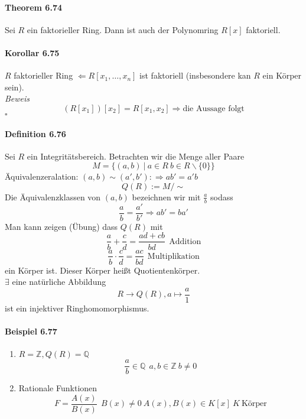 \documentclass{scrartcl}
\begin{document}
\paragraph{Theorem 6.74}
Sei $R$ ein faktorieller Ring. Dann ist auch der Polynomring $R[x]$ faktoriell.

\paragraph{Korollar 6.75}
$R$ faktorieller Ring $\Leftarrow R[x_1, \dots, x_n]$ ist faktoriell
(insbesondere kan $R$ ein Körper sein). \\
\textit{Beweis} \\
\[
  (R[x_1])[x_2] = R[x_1,x_2] \Rightarrow \text{die Aussage folgt}
\]
\hfill $\square$

\paragraph{Definition 6.76}
Sei $R$ ein Integritätsbereich. Betrachten wir die Menge aller Paare
\[
  M = \{(a,b) ~|~ a \in R ~ b \in R\backslash \{0\} \}
\]
Äquivalenzeralation: $(a,b) \sim (a', b') :\Rightarrow ab' = a'b$
\[
  Q(R) := M/\sim
\]
Die Äquivalenzklassen von $(a, b)$ bezeichnen wir mit $\frac{a}{b}$ sodass
\[
  \frac{a}{b} = \frac{a'}{b'} \Rightarrow ab' = ba'
\]
Man kann zeigen (Übung) dass $Q(R)$ mit
\[
  \frac{a}{b} + \frac{c}{d} = \frac{ad + cb}{bd} ~~\text{Addition}
\]
\[
  \frac{a}{b} \cdot \frac{c}{d} = \frac{ac}{bd} ~~\text{Multiplikation}
\]
ein Körper ist. Dieser Körper heißt Quotientenkörper. \\
$\exists$ eine natürliche Abbildung
\[
  R \to Q(R), a \mapsto \frac{a}{1}
\]
ist ein injektiver Ringhomomorphismus.

\paragraph{Beispiel 6.77}
\begin{enumerate}
\item $R = \mathbb{Z}, Q(R) = \mathbb{Q}$
  \[
    \frac{a}{b} \in \mathbb{Q} ~~ a,b \in \mathbb{Z} ~ b \neq 0
  \]
\item Rationale Funktionen
  \[
    F = \frac{A(x)}{B(x)} ~~ B(x) \neq 0 ~ A(x),B(x) \in K[x] ~ K ~\text{Körper}
  \]
\end{enumerate}
\end{document}
